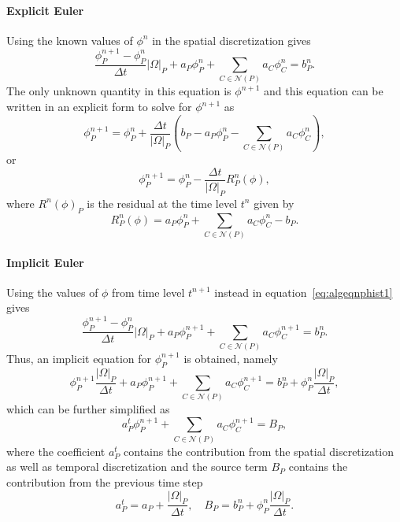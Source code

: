 \paragraph{Explicit Euler}
Using the known values of $\phi^n$ in the spatial discretization gives
\begin{equation}
\frac{\phi^{n+1}_P - \phi^n_P}{\Delta t} |\Omega|_P + a_P \phi_P^n + \sum_{C\in\mathcal{N}(P)}a_{C}\phi_{C}^n = b_P^n.
\end{equation}
The only unknown quantity in this equation is $\phi^{n+1}$ and this equation can be written in an explicit form to solve for $\phi^{n+1}$ as
\begin{equation*}
\phi^{n+1}_P = \phi^n_P + \frac{\Delta t}{|\Omega|_P}\left(b_P - a_P \phi_P^n - \sum_{C\in\mathcal{N}(P)}a_{C}\phi_{C}^n\right),
\end{equation*}
or 
\begin{equation}
\phi^{n+1}_P = \phi^n_P - \frac{\Delta t}{|\Omega|_P} R^n_P(\phi),
\end{equation}
where $R^n(\phi)_P$ is the residual at the time level $t^n$ given by
\begin{equation}
R^n_P(\phi) = a_P \phi_P^n + \sum_{C\in\mathcal{N}(P)}a_{C}\phi_{C}^n - b_P.
\end{equation}
\paragraph{Implicit Euler}
Using the values of $\phi$ from time level $t^{n+1}$ instead in equation~\ref{eq:algeqnphist1} gives
\begin{equation}
\frac{\phi^{n+1}_P - \phi^n_P}{\Delta t} |\Omega|_P + a_P \phi_P^{n+1} + \sum_{C\in\mathcal{N}(P)}a_{C}\phi_{C}^{n+1} = b_P^{n}.
\end{equation}
Thus, an implicit equation for $\phi^{n+1}_P$ is obtained, namely
\begin{equation*}
\phi^{n+1}_P \frac{|\Omega|_P}{\Delta t} + a_P \phi_P^{n+1} + \sum_{C\in\mathcal{N}(P)}a_{C}\phi_{C}^{n+1} = b_P^{n} + \phi^n_P \frac{|\Omega|_P}{\Delta t},
\end{equation*}
which can be further simplified as
\begin{equation}
a_P^t \phi_P^{n+1} + \sum_{C\in\mathcal{N}(P)}a_{C}\phi_{C}^{n+1} = B_P,
\label{eq:algeqnphiv1}
\end{equation}
where the coefficient $a_P^t$ contains the contribution from the spatial discretization as well as temporal discretization and the source term $B_P$ contains the contribution from the previous time step
\begin{equation}
a_P^t = a_P + \frac{|\Omega|_P}{\Delta t}, \quad B_P = b_P^{n} + \phi^n_P \frac{|\Omega|_P}{\Delta t}. 
\end{equation}


